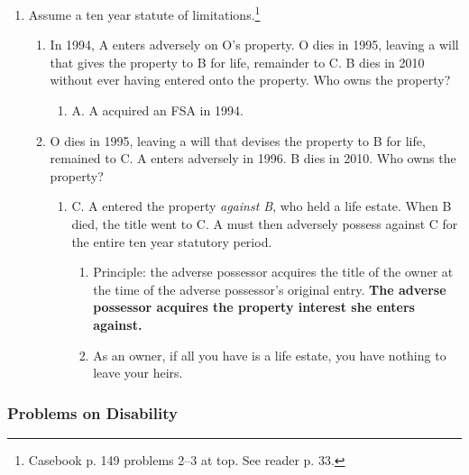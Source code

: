 \begin{enumerate}
    \item Assume a ten year statute of limitations.\footnote{Casebook p. 149 
    problems 2--3 at top. See reader p. 33.}
    \begin{enumerate}
        \item In 1994, A enters adversely on O's property. O dies in 1995, 
        leaving a will that gives the property to B for life, remainder to C. 
        B dies in 2010 without ever having entered onto the property. Who owns 
        the property?
        \begin{enumerate}
            \item A. A acquired an FSA in 1994.
        \end{enumerate}
        \item O dies in 1995, leaving a will that devises the property to B 
        for life, remained to C. A enters adversely in 1996. B dies in 2010. 
        Who owns the property?
        \begin{enumerate}
            \item C. A entered the property \emph{against B}, who held a life 
            estate. When B died, the title went to C. A must then adversely 
            possess against C for the entire ten year statutory period.
            \begin{enumerate}
                \item Principle: the adverse possessor acquires the title of the 
                owner at the time of the adverse possessor's original entry. 
                \textbf{The adverse possessor acquires the property interest she 
                enters against.}
                \item As an owner, if all you have is a life estate, you have 
                nothing to leave your heirs.
            \end{enumerate}
        \end{enumerate}
    \end{enumerate}
\end{enumerate}

\subsubsection{Problems on Disability}

